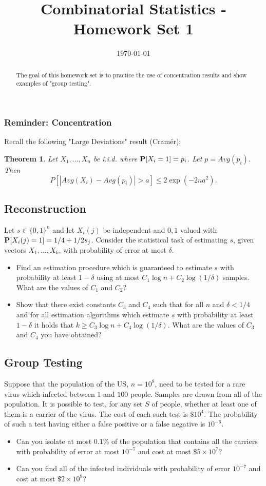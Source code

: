 \documentclass[11pt]{article} \usepackage{amssymb}
\newtheorem{theorem}{Theorem}[section]
\begin{document}
\title{Combinatorial Statistics - Homework Set 1}

\date{\today}
\maketitle
\begin{abstract}
The goal of this homework set is to practice the use of concentration results and show examples of "group testing".
\end{abstract}

\subsubsection{Reminder: Concentration}
Recall the following "Large Deviations" result (Cram\'{e}r):
\begin{theorem}
Let $X_1,\ldots,X_n$ be i.i.d. where $\P[X_i = 1] = p_i$. Let $p = Avg(p_i)$. Then
\[
P[|Avg(X_i) - Avg(p_i)| > a] \leq 2 \exp(-2n a^2).
\]
\end{theorem}

\subsection{Reconstruction}
Let $s \in \{0,1\}^n$ and let $X_i(j)$ be independent and $0,1$ valued with $\P[X_i(j) = 1] = 1/4 + 1/2 s_j$. 
Consider the statistical task of estimating $s$, given vectors $X_1,\ldots,X_k$, with probability of error at most $\delta$.
\begin{itemize}
\item
Find an estimation procedure which is guaranteed to estimate $s$ with probability at least $1-\delta$ using at most 
$C_1 \log n + C_2 \log (1/\delta)$ samples. What are the values of $C_1$ and $C_2$?  
\item
Show that there exist constants $C_3$ and $C_4$ such that for all $n$ and $\delta < 1/4$ and for all estimation algorithms 
which estimate $s$ with probability at least $1-\delta$ it holds that $k \geq C_3 \log n + C_4 \log (1/\delta)$. 
What are the values of $C_3$ and $C_4$ you have obtained? 
\end{itemize}

\subsection{Group Testing}
Suppose that the population of the US, $n=10^8$, need to be tested for a rare virus which infected between $1$ and $100$ people. 
Samples are drawn from all of the population. It is possible to test, for any set $S$ of people, whether at least one of them 
is a carrier of the virus. The cost of each such test is $\$10^4$. The probability of such a test having either a false positive or a false negative is $10^{-6}$. 

\begin{itemize}
\item
Can you isolate at most $0.1\%$ of the population that contains all the carriers with probability of error at most $10^{-7}$ 
and cost at most $\$5 \times 10^{7}$?
\item
Can you find all of the infected individuals with probability of error 
$10^{-7}$
and cost at most $\$2 \times 10^{8}$?
\end{itemize}
\end{document}
